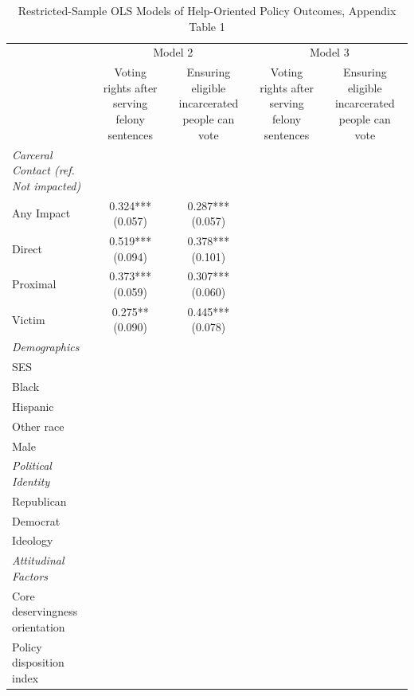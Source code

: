 \begin{table}[!htbp]
\centering
\caption{Restricted-Sample OLS Models of Help-Oriented Policy Outcomes, Appendix Table 1}
\label{tab:appendix\_help\_restricted\_1}
\begin{threeparttable}
\begin{tabular}{lcccc}
\toprule
 & \multicolumn{2}{c}{Model 2} & \multicolumn{2}{c}{Model 3}
 \\
\cmidrule(lr){2-3} \cmidrule(lr){4-5}
 & Voting rights after serving felony sentences & Ensuring eligible incarcerated people can vote & Voting rights after serving felony sentences & Ensuring eligible incarcerated people can vote
 \\
\midrule
\textit{Carceral Contact (ref. Not impacted)} &  &  &  & 
\\
Any Impact & \makecell[c]{0.324*** \\ (0.057)} & \makecell[c]{0.287*** \\ (0.057)} &  &  \\
Direct & \makecell[c]{0.519*** \\ (0.094)} & \makecell[c]{0.378*** \\ (0.101)} &  &  \\
Proximal & \makecell[c]{0.373*** \\ (0.059)} & \makecell[c]{0.307*** \\ (0.060)} &  &  \\
Victim & \makecell[c]{0.275** \\ (0.090)} & \makecell[c]{0.445*** \\ (0.078)} &  &  \\
\addlinespace
\textit{Demographics} &  &  &  &  \\
SES &  &  &  &  \\
Black &  &  &  &  \\
Hispanic &  &  &  &  \\
Other race &  &  &  &  \\
Male &  &  &  &  \\
\addlinespace
\textit{Political Identity} &  &  &  &  \\
Republican &  &  &  &  \\
Democrat &  &  &  &  \\
Ideology &  &  &  &  \\
\addlinespace
\textit{Attitudinal Factors} &  &  &  &  \\
Core deservingness orientation &  &  &  &  \\
Policy disposition index &  &  &  &  \\

\end{tabular}
\end{threeparttable}
\end{table}
